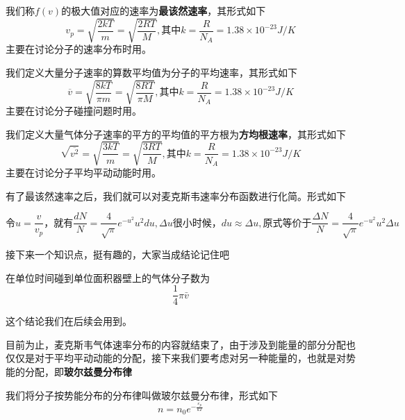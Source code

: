\documentclass[lang=cn,10pt]{elegantbook}
\begin{document}
	 \begin{definition}[三个速率]
	 	我们称$f(v)$的极大值对应的速率为\textbf{最该然速率}，其形式如下
	 	\begin{equation*}
	 		v_p=\sqrt{\frac{2kT}{m}}=\sqrt{\frac{2RT}{M}},\text{其中}k=\frac{R}{N_{A}}=1.38\times10^{-23}J/K
	 	\end{equation*}
	 	主要在讨论分子的速率分布时用。
	 	
	 	我们定义大量分子速率的算数平均值为分子的平均速率，其形式如下
	 	\begin{equation*}
	 		\overline{v}=\sqrt{\frac{8kT}{\pi m}}=\sqrt{\frac{8RT}{\pi M}},\text{其中}k=\frac{R}{N_{A}}=1.38\times10^{-23}J/K
	 	\end{equation*}
	 	主要在讨论分子碰撞问题时用。
	 	
	 	我们定义大量气体分子速率的平方的平均值的平方根为\textbf{方均根速率}，其形式如下
	 	\begin{equation*}
	 		\sqrt{\overline{v^2}}=\sqrt{\frac{3kT}{m}}=\sqrt{\frac{3RT}{M}},\text{其中}k=\frac{R}{N_{A}}=1.38\times10^{-23}J/K
	 	\end{equation*}
	 	主要在讨论分子平均平动动能时用。
	 \end{definition}
	 
	 有了最该然速率之后，我们就可以对麦克斯韦速率分布函数进行化简。形式如下
	 
	 	\begin{equation*}
	 		\text{令}u=\frac{v}{v_p}\text{，就有}
	 		\frac{dN}{N}=\frac{4}{\sqrt{\pi}}e^{-u^2}u^2du
	 		,\varDelta u\text{很小时候，}du\approx \varDelta u,
	 		\text{原式等价于}\frac{\varDelta N}{N}=\frac{4}{\sqrt{\pi}}e^{-u^2}u^2\varDelta u
	 	\end{equation*}

	接下来一个知识点，挺有趣的，大家当成结论记住吧
	
	\begin{theorem}[单位碰壁分子数]
		在单位时间碰到单位面积器壁上的气体分子数为
		\begin{equation*}
			\frac{1}{4}\pi \bar{v}
		\end{equation*}
	\end{theorem}
	这个结论我们在后续会用到。
	
	目前为止，麦克斯韦气体速率分布的内容就结束了，由于涉及到能量的部分分配也仅仅是对于平均平动动能的分配，接下来我们要考虑对另一种能量的，也就是对势能的分配，即\textbf{玻尔兹曼分布律}
	
	\begin{definition}[玻尔兹曼分布律]
		我们将分子按势能分布的分布律叫做玻尔兹曼分布律，形式如下
		\begin{equation*}
			n=n_{0}e^{-\frac{\varepsilon _p}{kT}}
		\end{equation*}
	\end{definition}
	
\end{document}
